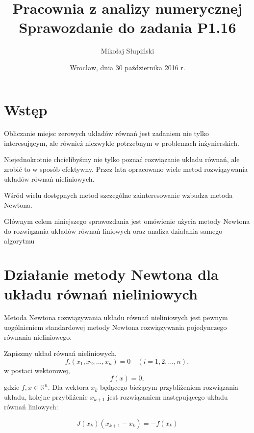 \documentclass{article}
\title{Pracownia z analizy numerycznej \\ Sprawozdanie do zadania P1.16}
\author{Mikołaj Słupiński}
\date{Wrocław, dnia 30 października 2016 r.}
\begin{document}
  \maketitle
  \section{Wstęp}
    \paragraph{} Obliczanie miejsc zerowych układów równań jest zadaniem nie tylko
    interesującym, ale również niezwykle potrzebnym w problemach inżynierskich.

    Niejednokrotnie chcielibyśmy nie tylko poznać rozwiązanie układu równań, ale
    zrobić to w sposób efektywny. Przez lata opracowano wiele metod rozwiązywania
    układów równań nieliniowych.

    Wśród wielu dostępnych metod szczególne zainteresowanie wzbudza metoda Newtona.

    Głównym celem niniejszego sprawozdania jest omówienie użycia metody Newtona
    do rozwiązania układów równań liniowych oraz analiza działania samego algorytmu

  \section{Działanie metody Newtona dla układu równań nieliniowych}

    \paragraph{} Metoda Newtona rozwiązywania układu równań nieliniowych jest pewnym
    uogólnieniem standardowej metody Newtona rozwiązywania pojedynczego równania nieliniowego.

    Zapiszmy układ równań nieliniowych,
    \begin{equation*}
      f_{i}(x_{1}, x_{2},...,x_{n}) = 0 \quad(i = 1, 2, ..., n),
    \end{equation*}
    w postaci wektorowej,
    \begin{equation*}
      f(x) = 0,
    \end{equation*}
    gdzie $f, x \in \mathbb{R}^n$. Dla wektora $x_{k}$ będącego bieżącym przybliżeniem
    rozwiązania układu, kolejne przybliżenie $x_{k+1}$ jest rozwiązaniem następującego
    układu równań liniowych:


    \begin{equation}\label{eq:rownanie1}
      J(x_{k})(x_{k+1} - x_{k}) = -f(x_{k})
    \end{equation}
\end{document}
